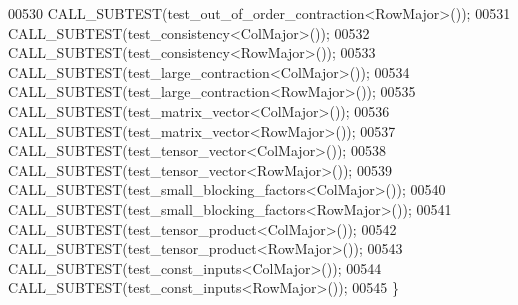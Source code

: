\begin{DoxyCode}
00530   CALL\_SUBTEST(test\_out\_of\_order\_contraction<RowMajor>());
00531   CALL\_SUBTEST(test\_consistency<ColMajor>());
00532   CALL\_SUBTEST(test\_consistency<RowMajor>());
00533   CALL\_SUBTEST(test\_large\_contraction<ColMajor>());
00534   CALL\_SUBTEST(test\_large\_contraction<RowMajor>());
00535   CALL\_SUBTEST(test\_matrix\_vector<ColMajor>());
00536   CALL\_SUBTEST(test\_matrix\_vector<RowMajor>());
00537   CALL\_SUBTEST(test\_tensor\_vector<ColMajor>());
00538   CALL\_SUBTEST(test\_tensor\_vector<RowMajor>());
00539   CALL\_SUBTEST(test\_small\_blocking\_factors<ColMajor>());
00540   CALL\_SUBTEST(test\_small\_blocking\_factors<RowMajor>());
00541   CALL\_SUBTEST(test\_tensor\_product<ColMajor>());
00542   CALL\_SUBTEST(test\_tensor\_product<RowMajor>());
00543   CALL\_SUBTEST(test\_const\_inputs<ColMajor>());
00544   CALL\_SUBTEST(test\_const\_inputs<RowMajor>());
00545 \}
\end{DoxyCode}

